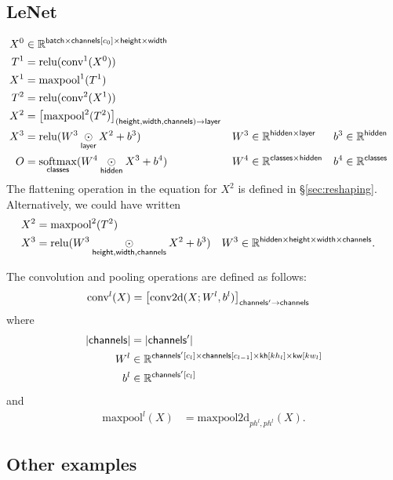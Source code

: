 \documentclass{article}
\newcommand{\reals}{\mathbb{R}}
\begin{document}
\subsection{LeNet}

\begin{align*}
X^0 &\in \reals^{\name{batch} \times \nset{channels}{c_0} \times \name{height} \times \name{width}} \\
T^1 &= \text{relu}(\text{conv}^1(X^0)) \\
X^1 &= \text{maxpool}^1(T^1) \\
T^2 &= \text{relu}(\text{conv}^2(X^1)) \\
X^2 &= \nmov{(height,width,channels)}{layer}{\text{maxpool}^2(T^2)} \\
X^3 &= \text{relu}(W^3 \ndot{layer} X^2 + b^3) & W^3 &\in \mathbb{R}^{\name{hidden} \times \name{layer}} & b^3 &\in \mathbb{R}^{\name{hidden}} \\
O &= \nfun{classes}{softmax} (W^4 \ndot{hidden} X^3 + b^4) & W^4 &\in \mathbb{R}^{\name{classes} \times \name{hidden}} & b^4 &\in \mathbb{R}^{\name{classes}}
\end{align*}
The flattening operation in the equation for $X^2$ is defined in \S{\ref{sec:reshaping}}. Alternatively, we could have written
\begin{align*}
X^2 &= \text{maxpool}^2(T^2) \\
X^3 &= \text{relu}(W^3 \ndot{height,width,channels} X^2 + b^3) & W^3 &\in \mathbb{R}^{\name{hidden} \times \name{height} \times \name{width} \times \name{channels}}.
\end{align*}

The convolution and pooling operations are defined as follows:
\begin{align*}
\text{conv}^l(X) &= \nmov{channels'}{channels}{\text{conv2d}(X; W^l, b^l)}
\end{align*}
where
\begin{align*}
|\name{channels}| &= |\name{channels'}| \\
W^l & \in \reals^{\nset{channels'}{c_{l}} \times \nset{channels}{c_{l-1}} \times \nset{kh}{kh_l} \times \nset{kw}{kw_l}} \\
b^l &\in \reals^{\nset{channels'}{c_{l}}}
\end{align*}
and
\begin{align*}
\text{maxpool}^l(X) &= \text{maxpool2d}_{ph^l,ph^l}(X).
\end{align*}

\subsection{Other examples}
\end{document}
